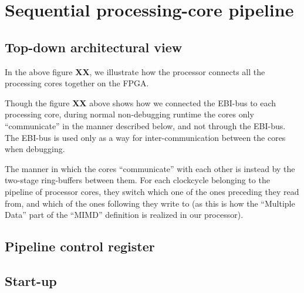 \FloatBarrier
\section{Sequential processing-core pipeline}\label{section:sequential-pipeline}

\FloatBarrier
\subsection{Top-down architectural view}


In the above figure \textbf{XX}, we
illustrate how the processor connects all the processing cores together on the
FPGA.

Though the figure \textbf{XX}
above shows how we connected the EBI-bus\cite{efm_ebi} to each processing core,
during normal non-debugging runtime the cores only ``communicate'' in the manner
described below, and not through the EBI-bus. The EBI-bus is used only as a way
for inter-communication between the cores when debugging.

The manner in which the cores ``communicate'' with each other is instead by the
two-stage ring-buffers between them. For each clockcycle belonging to the
pipeline of processor cores, they switch which one of the ones preceding they
read from, and which of the ones following they write to (as this is how the
``Multiple Data'' part of the ``MIMD'' definition is realized in our processor).

\FloatBarrier
\subsection{Pipeline control register}\label{subsection:fpga-pipeline-startup}


\subsection{Start-up}\label{subsection:fpga-pipeline-startup}


